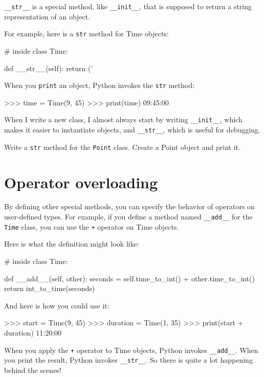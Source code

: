 \verb"__str__" is a special method, like \verb"__init__",
that is supposed to return a string representation of an object.


For example, here is a {\tt str} method for Time objects:

\beforeverb
\begin{pycode}
# inside class Time:

    def __str__(self):
        return ('%
\end{pycode}
\afterverb
%
When you {\tt print} an object, Python invokes the {\tt str} method:


\beforeverb
\begin{pyinterpreter}
>>> time = Time(9, 45)
>>> print(time)
09:45:00
\end{pyinterpreter}
\afterverb
%
When I write a new class, I almost always start by writing 
\verb"__init__", which makes it easier to instantiate objects, and 
\verb"__str__", which is useful for debugging.


\begin{exercise}
Write a {\tt str} method for the {\tt Point} class.  Create
a Point object and print it.
\end{exercise}


\section{Operator overloading}
\label{operator overloading}

By defining other special methods, you can specify the behavior
of operators on user-defined types.  For example, if you define
a method named \verb"__add__" for the {\tt Time} class, you can use the
{\tt +} operator on Time objects.

Here is what the definition might look like:


\beforeverb
\begin{pycode}
# inside class Time:

    def __add__(self, other):
        seconds = self.time_to_int() + other.time_to_int()
        return int_to_time(seconds)
\end{pycode}
\afterverb
%
And here is how you could use it:

\beforeverb
\begin{pyinterpreter}
>>> start = Time(9, 45)
>>> duration = Time(1, 35)
>>> print(start + duration)
11:20:00
\end{pyinterpreter}
\afterverb
%
When you apply the {\tt +} operator to Time objects, Python invokes
\verb"__add__".  When you print the result, Python invokes 
\verb"__str__".  So there is quite a lot happening behind the scenes!

